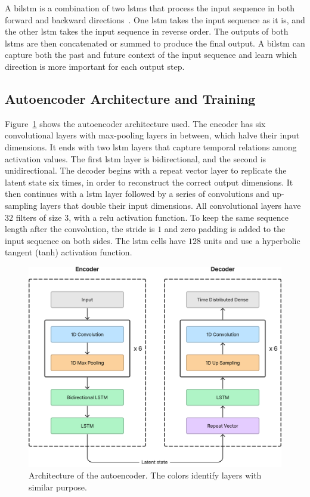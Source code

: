 A \acrfull{bilstm} is a combination of two \acrshort{lstm}s that process the input sequence in both forward and backward directions~\parencite{schusterBidirectionalRecurrentNeural1997}. One \acrshort{lstm} takes the input sequence as it is, and the other \acrshort{lstm} takes the input sequence in reverse order. The outputs of both \acrshort{lstm}s are then concatenated or summed to produce the final output. A \acrshort{bilstm} can capture both the past and future context of the input sequence and learn which direction is more important for each output step.

\subsection{Autoencoder Architecture and Training}

Figure~\ref{fig:autoencoder_architecture} shows the autoencoder architecture used. The encoder has six convolutional layers with max-pooling layers in between, which halve their input dimensions. It ends with two \acrshort{lstm} layers that capture temporal relations among activation values. The first \acrshort{lstm} layer is bidirectional, and the second is unidirectional. The decoder begins with a repeat vector layer to replicate the latent state six times, in order to reconstruct the correct output dimensions. It then continues with a \acrshort{lstm} layer followed by a series of convolutions and up-sampling layers that double their input dimensions. All convolutional layers have $32$ filters of size $3$, with a \acrfull{relu} activation function. To keep the same sequence length after the convolution, the stride is $1$ and zero padding is added to the input sequence on both sides. The \acrshort{lstm} cells have $128$ units and use a hyperbolic tangent (tanh) activation function.

\begin{figure}
  \centering
  \includegraphics[width=.8\linewidth]{images/modes_clustering/autoencoder.png}
  \caption[Architecutre of the autoencoder]{Architecture of the autoencoder. The colors identify layers with similar purpose.}
  \label{fig:autoencoder_architecture}
\end{figure}

